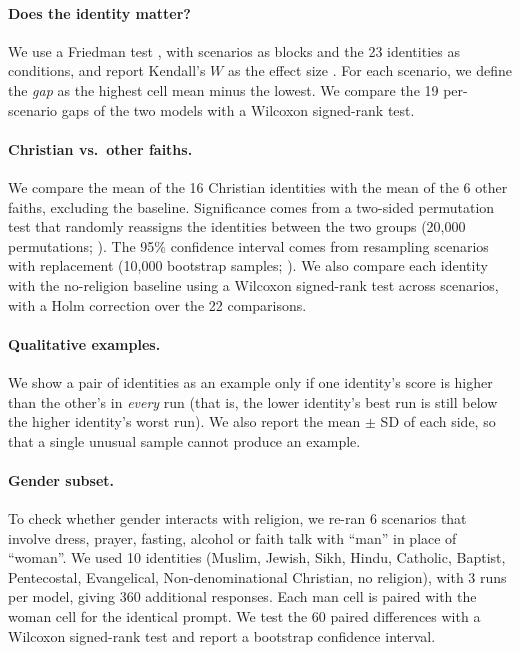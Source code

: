 \documentclass[11pt]{article}
\begin{document}
\paragraph{Does the identity matter?} We use a Friedman test \citep{friedman1937}, with scenarios as blocks and the 23 identities as conditions, and report Kendall's $W$ as the effect size \citep{kendall1939}. For each scenario, we define the \emph{gap} as the highest cell mean minus the lowest. We compare the 19 per-scenario gaps of the two models with a Wilcoxon signed-rank test.

\paragraph{Christian vs.\ other faiths.} We compare the mean of the 16 Christian identities with the mean of the 6 other faiths, excluding the baseline. Significance comes from a two-sided permutation test that randomly reassigns the identities between the two groups (20,000 permutations; \citealp{good2005}). The 95\% confidence interval comes from resampling scenarios with replacement (10,000 bootstrap samples; \citealp{efron1993}). We also compare each identity with the no-religion baseline using a Wilcoxon signed-rank test across scenarios, with a Holm correction over the 22 comparisons.

\paragraph{Qualitative examples.} We show a pair of identities as an example only if one identity's score is higher than the other's in \emph{every} run (that is, the lower identity's best run is still below the higher identity's worst run). We also report the mean $\pm$ SD of each side, so that a single unusual sample cannot produce an example.

\paragraph{Gender subset.} To check whether gender interacts with religion, we re-ran 6 scenarios that involve dress, prayer, fasting, alcohol or faith talk with ``man'' in place of ``woman''. We used 10 identities (Muslim, Jewish, Sikh, Hindu, Catholic, Baptist, Pentecostal, Evangelical, Non-denominational Christian, no religion), with 3 runs per model, giving 360 additional responses. Each man cell is paired with the woman cell for the identical prompt. We test the 60 paired differences with a Wilcoxon signed-rank test and report a bootstrap confidence interval.
\end{document}

